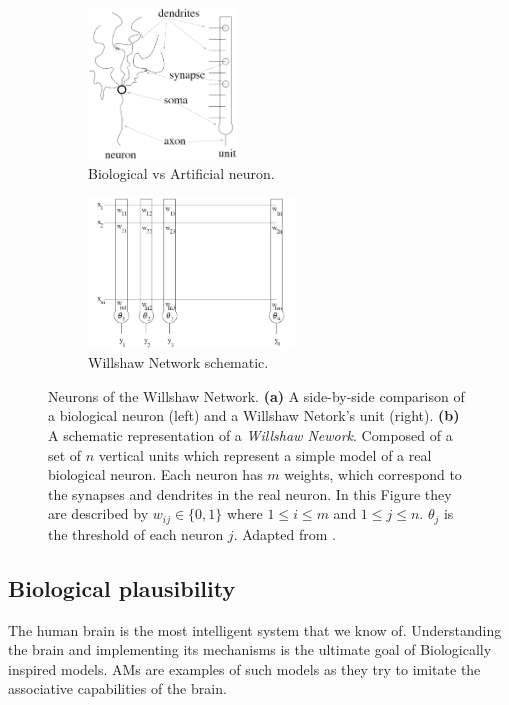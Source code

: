 \documentclass[runningheads]{llncs}
\begin{document}
\begin{figure}[htbp]
     \centering
     \begin{subfigure}[t]{0.49\textwidth}
         \centering
         \includegraphics[height=4cm]{img/wichert2.png}
         \caption{Biological vs Artificial neuron.}
         \label{WN2}
     \end{subfigure}
     \hfill
     \begin{subfigure}[t]{0.4\textwidth}
         \centering
         \includegraphics[height=4cm]{img/wichert1.png}
         \caption{Willshaw Network schematic.}
         \label{WN1}
     \end{subfigure}
     \hfill
        \caption{Neurons of the Willshaw Network. \textbf{(a)} A side-by-side comparison of a biological neuron (left) and a Willshaw Netork's unit (right). \textbf{(b)} A schematic representation of a \textit{Willshaw Nework}. Composed of a set of  $n$ vertical units which represent a simple model of a real biological neuron. Each neuron has $m$ weights, which correspond to the synapses and dendrites in the real neuron. In this Figure they are described by $w_{ij} \in  \{0,1\}$ where $1\leq i \leq m$ and $1 \leq j \leq n$. $\theta_j$ is the threshold of each neuron $j$. Adapted from \cite{wichert2020principles}.}
        \label{fig:WN}
\end{figure}


\subsection{Biological plausibility}
\label{sec:wn_bio}
The human brain is the most intelligent system that we know of. Understanding the brain and implementing its mechanisms is the ultimate goal of Biologically inspired models. AMs are examples of such models as they try to imitate the associative capabilities of the brain.
\end{document}
